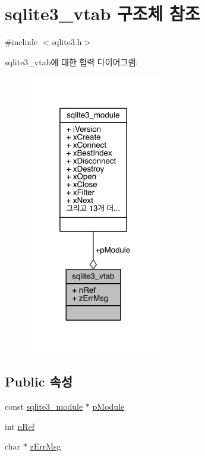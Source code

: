 \hypertarget{structsqlite3__vtab}{}\section{sqlite3\+\_\+vtab 구조체 참조}
\label{structsqlite3__vtab}


{\ttfamily \#include $<$sqlite3.\+h$>$}



sqlite3\+\_\+vtab에 대한 협력 다이어그램\+:
\nopagebreak
\begin{figure}[H]
\begin{center}
\leavevmode
\includegraphics[width=169pt]{structsqlite3__vtab__coll__graph}
\end{center}
\end{figure}
\subsection*{Public 속성}
\begin{DoxyCompactItemize}
\item 
const \hyperlink{structsqlite3__module}{sqlite3\+\_\+module} $\ast$ \hyperlink{structsqlite3__vtab_a4ef8198ca611b73a9b23054dd1e91e2b}{p\+Module}
\item 
int \hyperlink{structsqlite3__vtab_ab3c80d385849bdd82363a0df7d6fcba8}{n\+Ref}
\item 
char $\ast$ \hyperlink{structsqlite3__vtab_afc50eadfdd7cef876633d460deba48d6}{z\+Err\+Msg}
\end{DoxyCompactItemize}



